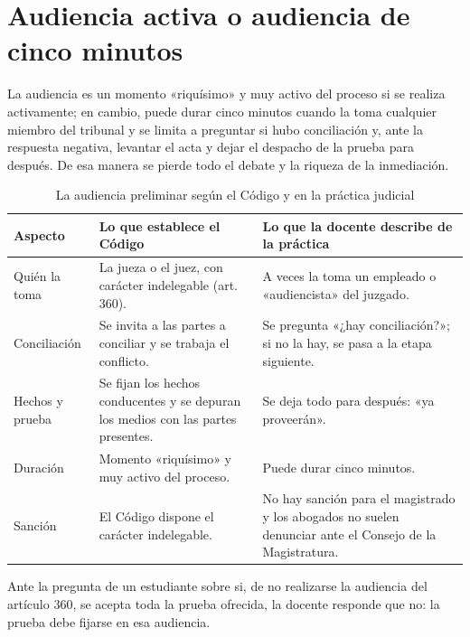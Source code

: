 \documentclass[12pt,oneside]{book}
\begin{document}
\section{Audiencia activa o audiencia de cinco minutos}

La audiencia es un momento «riquísimo» y muy activo del proceso si se realiza activamente; en cambio, puede durar cinco minutos cuando la toma cualquier miembro del tribunal y se limita a preguntar si hubo conciliación y, ante la respuesta negativa, levantar el acta y dejar el despacho de la prueba para después. De esa manera se pierde todo el debate y la riqueza de la inmediación.

\begin{table}[H]
\centering
\caption{La audiencia preliminar según el Código y en la práctica judicial}
\small
\begin{tabularx}{\textwidth}{>{\raggedright\arraybackslash}p{2.6cm} >{\raggedright\arraybackslash}X >{\raggedright\arraybackslash}X}
\toprule
\textbf{Aspecto} & \textbf{Lo que establece el Código} & \textbf{Lo que la docente describe de la práctica} \\
\midrule
Quién la toma & La jueza o el juez, con carácter indelegable (art. 360). & A veces la toma un empleado o «audiencista» del juzgado. \\
Conciliación & Se invita a las partes a conciliar y se trabaja el conflicto. & Se pregunta «¿hay conciliación?»; si no la hay, se pasa a la etapa siguiente. \\
Hechos y prueba & Se fijan los hechos conducentes y se depuran los medios con las partes presentes. & Se deja todo para después: «ya proveerán». \\
Duración & Momento «riquísimo» y muy activo del proceso. & Puede durar cinco minutos. \\
Sanción & El Código dispone el carácter indelegable. & No hay sanción para el magistrado y los abogados no suelen denunciar ante el Consejo de la Magistratura. \\
\bottomrule
\end{tabularx}
\end{table}

\begin{note}
Ante la pregunta de un estudiante sobre si, de no realizarse la audiencia del artículo 360, se acepta toda la prueba ofrecida, la docente responde que no: la prueba debe fijarse en esa audiencia.
\end{note}

\end{document}
